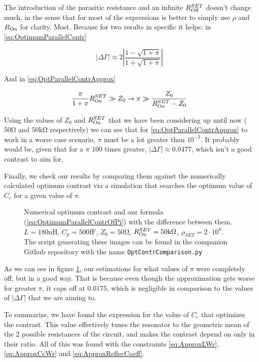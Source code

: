 \documentclass[../main.tex]{subfiles}
\begin{document}
The introduction of the parasitic resistance and an infinite \(R_{\text{Off}}^{SET}\)
doesn't change much, in the sense that for most of the expressions is better
to simply use \(\rho\) and \(R_{\text{On}}\) for clarity. Most. Because for two results
in specific it helps: in \ref{eq:OptimumParallelContr}

\begin{equation}
\label{eq:OptimumParallelContrOfPi}
    |\Delta\Gamma| \approx
                   2\left|
                   \frac{1 - \sqrt{1 + \pi}}{1 + \sqrt{1 + \pi}}
                   \right|
\end{equation}

And in \ref{eq:OptParallelContrApprox}

\begin{equation}
\label{eq:OptParallelContrApproxOfPi}
\frac{\pi}{1 + \pi}R_{\text{On}}^{SET} \gg Z_{0} \rightarrow
\pi \gg \frac{Z_{0}}{R_{\text{On}}^{SET} - Z_{0}}
\end{equation}

Using the values of \(Z_{0}\) and \(R_{\text{On}}^{SET}\) that we have been considering
up until now (\(50\unit{\ohm}\) and \(50\unit{\kilo\ohm}\) respectively) we can
see that for \ref{eq:OptParallelContrApprox} to work in a worse case scenario,
\(\pi\) must be a lot greater than \(10^{-3}\). It probably would
be, given that for a \(\pi\) 100 times greater,
\(|\Delta\Gamma| \approx 0.0477\), which isn't a good contrast to
aim for.

Finally, we check our results by comparing them against the numerically
calculated optimum contrast via a simulation that searches the optimum
value of \(C_{c}\) for a given value of \(\pi\).

\begin{figure}[t]
\centering
  
  \caption{Numerical optimum contrast and our formula (\ref{eq:OptimumParallelContrOfPi})
  with the difference between them.
\(L = 180\unit{\nano\henry}\), \(C_{p} = 500\unit{\femto\farad}\),
\(Z_{0} = 50\unit{\ohm}\), \(\ROn^{SET} = 50\unit{\kilo\ohm}\),
\(\rho_{SET} = 2\cdot10^{6}\). The script generating these images can be found
in the companion Github repository with the name \texttt{OptContrComparison.py}}
\label{fig:ParallelContrComparison}
\end{figure}

As we can see in figure \ref{fig:ParallelContrComparison}, our
estimations for what values of \(\pi\) were completely off, but in a good way.
That is because even though the approximation gets worse for greater \(\pi\),
it caps off at \(0.0175\), which is negligible in comparison to the values of
\(|\Delta\Gamma|\) that we are aiming to.

To summarize, we have found the expression for the value of \(C_{c}\) that
optimizes the contrast. This value effectively tunes the resonator to the
geometric mean of the 2 possible resistances of the circuit, and makes
the contrast depend on only in their ratio. All of this was found with
the constraints \ref{eq:ApproxLWr}, \ref{eq:ApproxCcWr} and
\ref{eq:ApproxReflecCoeff}.
\end{document}
